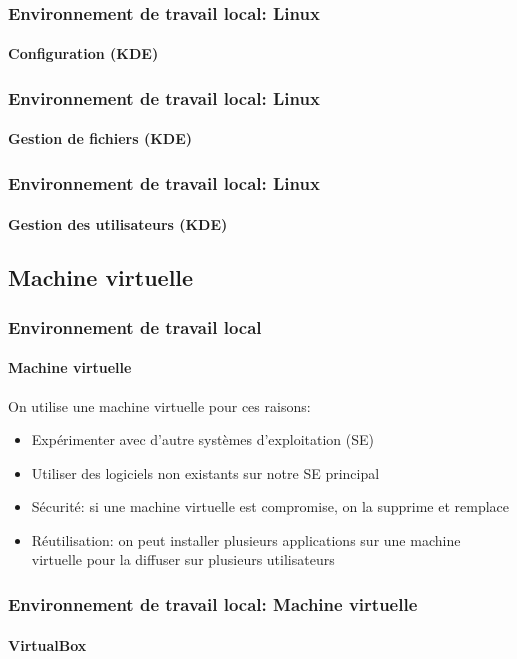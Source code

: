 \documentclass[xcolor=table]{beamer}
\begin{document}
\begin{frame}
\frametitle{Environnement de travail local: Linux}
\framesubtitle{Configuration (KDE)}

\begin{center}
\end{center}

\end{frame}

\begin{frame}
\frametitle{Environnement de travail local: Linux}
\framesubtitle{Gestion de fichiers (KDE)}

\begin{center}
\end{center}

\end{frame}

\begin{frame}
\frametitle{Environnement de travail local: Linux}
\framesubtitle{Gestion des utilisateurs (KDE)}

\begin{center}
\end{center}

\end{frame}

\subsection{Machine virtuelle}

\begin{frame}
\frametitle{Environnement de travail local}
\framesubtitle{Machine virtuelle}

On utilise une machine virtuelle pour ces raisons:
\begin{itemize}
	\item Expérimenter avec d'autre systèmes d'exploitation (SE)
	\item Utiliser des logiciels non existants sur notre SE principal
	\item Sécurité: si une machine virtuelle est compromise, on la supprime et remplace
	\item Réutilisation: on peut installer plusieurs applications sur une machine virtuelle pour la diffuser sur plusieurs utilisateurs 
\end{itemize}

\end{frame}

\begin{frame}
\frametitle{Environnement de travail local: Machine virtuelle}
\framesubtitle{VirtualBox}

\begin{center}
\end{center}

\end{frame}
\end{document}
